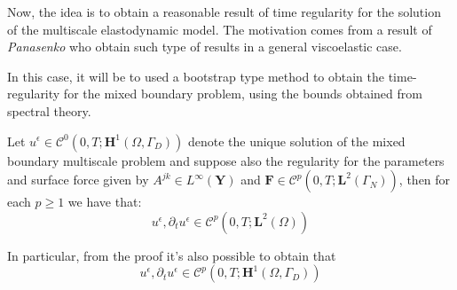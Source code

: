 
Now, the idea is to obtain a reasonable result of time regularity for the solution of the multiscale elastodynamic model. The motivation comes from a result of \textit{Panasenko} who obtain such type of results in a general viscoelastic case.

In this case, it will be to used a bootstrap type method to obtain the time-regularity for the mixed boundary problem, using the bounds obtained from spectral theory.

\begin{prop}
\label{BootstrapingProp}
Let $u^{\epsilon} \in \mathcal{C}^{0}(0,T; \mathbf{H}^1(\Omega, \Gamma_D))$ denote the unique solution of the mixed boundary multiscale problem and suppose also the regularity for the parameters and surface force given by $A^{jk} \in L^{\infty}(\mathbf{Y})$ and $\mathbf{F} \in \mathcal{C}^p(0,T; \mathbf{L}^{2}(\Gamma_N))$, then for each $p \geq 1$ we have that:
\begin{equation*}
    u^{\epsilon}, \partial_t u^{\epsilon} \in \mathcal{C}^p(0,T; \mathbf{L}^2(\Omega))
\end{equation*}
\end{prop}
\begin{rem}
In particular, from the proof it's also possible to obtain that
\begin{equation*}
    u^{\epsilon}, \partial_t u^{\epsilon} \in \mathcal{C}^p(0,T; \mathbf{H}^1(\Omega, \Gamma_D))
\end{equation*}
\end{rem}

